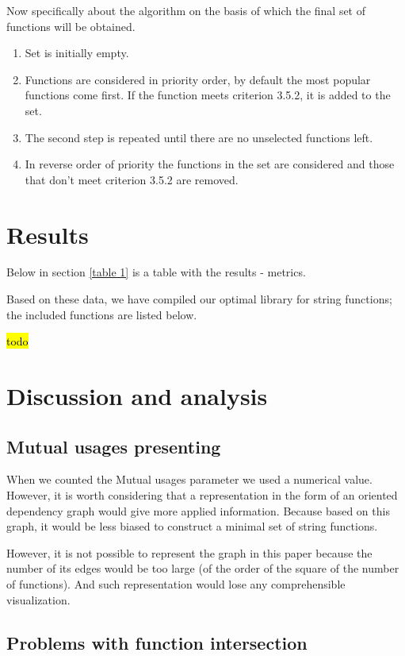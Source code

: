 \documentclass[anonymous,sigplan,review,11pt,nonacm,natbib=false]{acmart}
\begin{document}
    Now specifically about the algorithm on the basis of which the final set of functions will be obtained.

    \begin{enumerate}
        \item Set is initially empty.
        \item Functions are considered in priority order, by default the most popular functions come first. If the function meets criterion 3.5.2, it is added to the set.
        \item The second step is repeated until there are no unselected functions left.
        \item In reverse order of priority the functions in the set are considered and those that don't meet criterion 3.5.2 are removed.
    \end{enumerate}

    \section{Results}

    Below in section \ref{table 1} is a table with the results - metrics.

    Based on these data, we have compiled our optimal library for string functions; the included functions are listed below.

    \hl{todo}

    \section{Discussion and analysis}

    \subsection{Mutual usages presenting}

    When we counted the Mutual usages parameter we used a numerical value. However, it is worth considering that a representation in the form of an oriented dependency graph would give more applied information. Because based on this graph, it would be less biased to construct a minimal set of string functions.

    However, it is not possible to represent the graph in this paper because the number of its edges would be too large (of the order of the square of the number of functions). And such representation would lose any comprehensible visualization.

    \subsection{Problems with function intersection}
\end{document}
